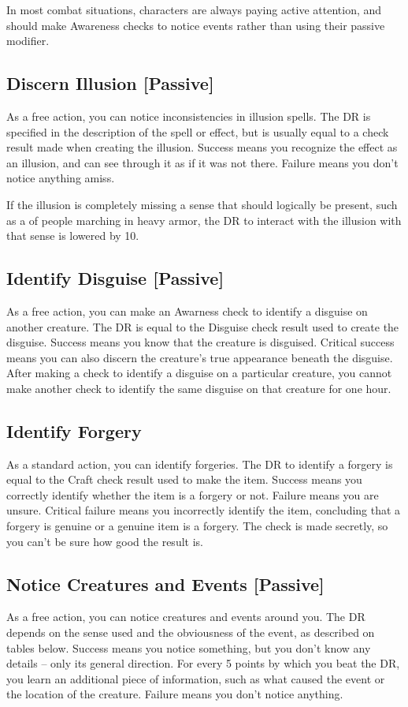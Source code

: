         In most combat situations, characters are always paying active attention, and should make Awareness checks to notice events rather than using their passive modifier.

    \subsection{Discern Illusion [Passive]}
        As a free action, you can notice inconsistencies in illusion spells. The DR is specified in the description of the spell or effect, but is usually equal to a check result made when creating the illusion. Success means you recognize the effect as an illusion, and can see through it as if it was not there. Failure means you don't notice anything amiss.

        If the illusion is completely missing a sense that should logically be present, such as a  of people marching in heavy armor, the DR to interact with the illusion with that sense is lowered by 10.

    \subsection{Identify Disguise [Passive]}
        As a free action, you can make an Awarness check to identify a disguise on another creature. The DR is equal to the Disguise check result used to create the disguise. Success means you know that the creature is disguised. Critical success means you can also discern the creature's true appearance beneath the disguise. After making a check to identify a disguise on a particular creature, you cannot make another check to identify the same disguise on that creature for one hour.

    \subsection{Identify Forgery}
        As a standard action, you can identify forgeries. The DR to identify a forgery is equal to the Craft check result used to make the item. Success means you correctly identify whether the item is a forgery or not. Failure means you are unsure. Critical failure means you incorrectly identify the item, concluding that a forgery is genuine or a genuine item is a forgery. The check is made secretly, so you can't be sure how good the result is.

    \subsection{Notice Creatures and Events [Passive]}
        As a free action, you can notice creatures and events around you. The DR depends on the sense used and the obviousness of the event, as described on tables below. Success means you notice something, but you don't know any details -- only its general direction. For every 5 points by which you beat the DR, you learn an additional piece of information, such as what caused the event or the location of the creature. Failure means you don't notice anything.

